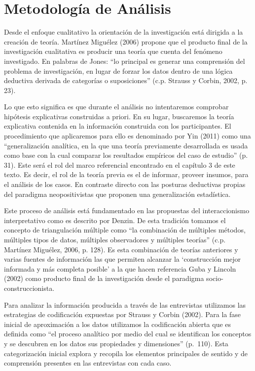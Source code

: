 \section{Metodología de Análisis}
Desde el enfoque cualitativo la orientación de la investigación está dirigida a
la creación de teoría.
Martínez Miguélez (2006) propone que el producto final de la investigación
cualitativa es producir una teoría que cuenta del fenómeno investigado.
En palabras de Jones: “lo principal es generar una comprensión del problema de
investigación, en lugar de forzar los datos dentro de una lógica deductiva
derivada de categorías o suposiciones” (c.p. Strauss y Corbin, 2002, p. 23).

Lo que esto significa es que durante el análisis no intentaremos comprobar
hipótesis explicativas construidas a priori.
En su lugar, buscaremos la teoría explicativa contenida en la información
construida con los participantes.
El procedimiento que aplicaremos para ello es denominado por Yin (2011) como una
“generalización analítica, en la que una teoría previamente desarrollada es
usada como base con la cual comparar los resultados empíricos del caso de
estudio” (p. 31).
Este será el rol del marco referencial encontrado en el capítulo 3 de este
texto.
Es decir, el rol de la teoría previa es el de informar, proveer insumos, para el
análisis de los casos.
En contraste directo con las posturas deductivas propias del paradigma
neopositivistas que proponen una generalización estadística.

Este proceso de análisis está fundamentado en las propuestas del interaccionismo
interpretativo como es descrito por Denzin.
De esta tradición tomamos el concepto de triangulación múltiple como “la
combinación de múltiples métodos, múltiples tipos de datos, múltiples
observadores y múltiples teorías” (c.p. Martínez Miguélez, 2006, p. 128).
Es esta combinación de teorías anteriores y varias fuentes de información las
que permiten alcanzar la ‘construcción mejor informada y más completa
posible’ a la que hacen referencia Guba y Lincoln (2002) como producto final de
la investigación desde el paradigma socio-construccionista.

Para analizar la información producida a través de las entrevistas utilizamos
las estrategias de codificación expuestas por Strauss y Corbin (2002).
Para la fase inicial de aproximación a los datos utilizamos la codificación
abierta que es definida como “el proceso analítico por medio del cual se
identifican los conceptos y se descubren en los datos sus propiedades y
dimensiones” (p.~110).
Esta categorización inicial explora y recopila los elementos principales
de sentido y de comprensión presentes en las entrevistas con cada caso.

